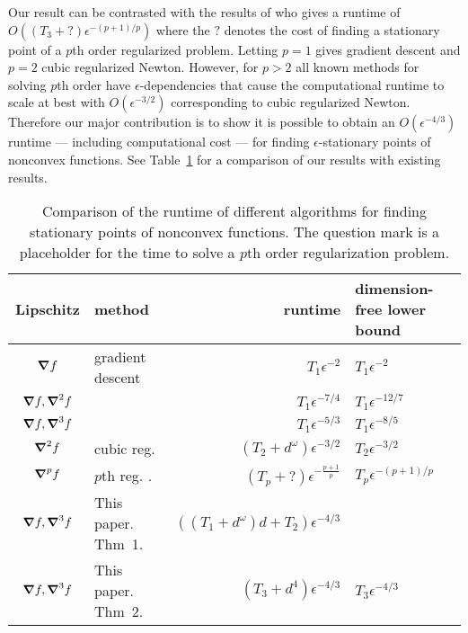 \documentclass[12pt,final]{colt2018} %
\newcommand\blfootnote[1]{%
  \begingroup
  \renewcommand\thefootnote{}\footnote{#1}%
  \addtocounter{footnote}{-1}%
  \endgroup
}
\def\Dim{d}
\def\TimeGrad{T_{1}}
\def\TimeHess{T_{2}}
\def\TimeCube{T_{3}}
\def\TimeP{T_{p}}
\def\cite{\citet}
\begin{document}
Our result can be contrasted with the results of \cite*{birgin2017worst} who gives a runtime of $O( (\TimeCube + ?)  \epsilon^{-(p+1)/p} )$ where the $?$ denotes the cost of finding a stationary point of a $p$th order regularized problem. Letting $p = 1$ gives gradient descent and $p=2$ cubic regularized Newton. However, for $p > 2$ all known methods for solving $p$th order have $\epsilon$-dependencies that cause the computational runtime to scale at best with $O(\epsilon^{-3/2})$ corresponding to cubic regularized Newton. Therefore our major contribution is to show it is possible to obtain an $O(\epsilon^{-4/3})$ runtime --- including computational cost --- for finding $\epsilon$-stationary points of nonconvex functions. See Table~\ref{table-results} for a comparison of our results with existing results.
\begin{table}[H]
\begin{tabular}{ |c|p{4.0cm}|r|p{3.2cm}| } 
 \hline
Lipschitz  & method & runtime & dimension-free lower bound \citep{carmon2017lower,carmon2017lowerII}  \\ 
\hline
$\grad f$  & gradient descent & $\TimeGrad \epsilon^{-2}$ & $\TimeGrad \epsilon^{-2}$  \\ 
$\grad f, \grad^2 f$  & \cite{carmon2017convex} & $\TimeGrad \epsilon^{-7/4}$ & $\TimeGrad \epsilon^{-12/7}$ \\ 
$\grad f, \grad^3 f$    &  \cite{carmon2017convex} & $\TimeGrad  \epsilon^{-5/3}$ & $\TimeGrad \epsilon^{-8/5}$  \\ 
$\grad^2 f$  & cubic reg. \cite{nesterov2006cubic} & $(\TimeHess + \Dim^{\omega}) \epsilon^{-3/2}$ & $\TimeHess \epsilon^{-3/2}$  \\ 
$\grad^p f$  & $p$th reg. \cite{birgin2017worst}. & $(\TimeP + ?) \epsilon^{-\frac{p+1}{p}}$ &$\TimeP \epsilon^{-(p+1)/p}$ \\ 
$\grad f, \grad^3 f$  &  This paper. Thm~1. & $( (\TimeGrad + \Dim^{\omega}) \Dim + \TimeHess)  \epsilon^{-4/3}$ &  \\ 
$\grad f, \grad^3 f$  & This paper. Thm~2. & $(\TimeCube + \Dim^{4}) \epsilon^{-4/3}$ & $\TimeCube \epsilon^{-4/3}$  \\ 
 \hline
\end{tabular}
\caption{Comparison of the runtime of different algorithms for finding stationary points of nonconvex functions. The question mark is a placeholder for the time to solve a $p$th order regularization problem.}\label{table-results}
\end{table}




\ifSIAM

\fi


\end{document}
